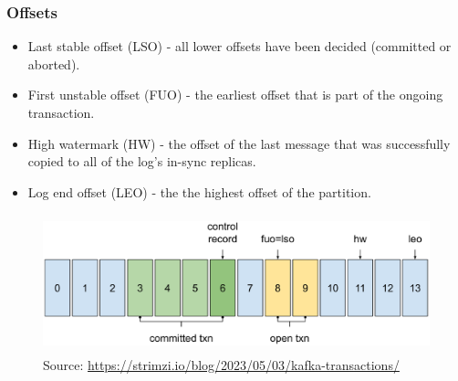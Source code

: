 \documentclass[10pt,utf8]{beamer}
\begin{document}
% 

\begin{frame}
    \frametitle{Offsets}
    \begin{itemize}
      \item Last stable offset (LSO) - all lower offsets have been decided (committed or aborted).
      \item First unstable offset (FUO) - the earliest offset that is part of the ongoing transaction.
      \item High watermark (HW) - the offset of the last message that was successfully copied to all of the log’s in-sync replicas.
      \item Log end offset (LEO) - the the highest offset of the partition.
    \end{itemize}

    \begin{figure}
        \centering
        \includegraphics[height=4cm]{./img/tx_offsets.eps}
        \caption{\tiny{Source: \url{https://strimzi.io/blog/2023/05/03/kafka-transactions/}}}
    \end{figure}
\end{frame}
\end{document}
